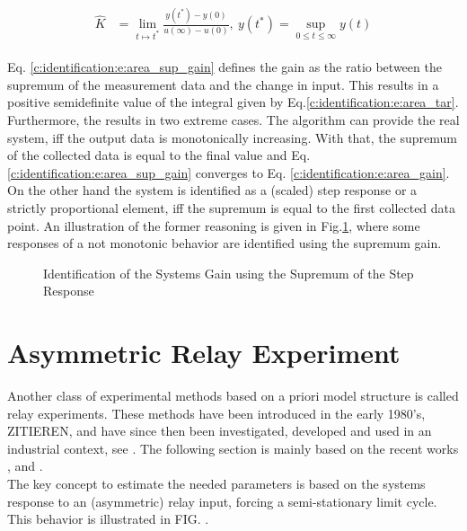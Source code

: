 \begin{align}
\begin{split}
\hat{K} &= \lim_{t\mapsto t^*} \frac{y(t^*)-y(0)}{u(\infty)-u(0)}, ~ y(t^*) = \sup_{0 \leq t \leq \infty} y(t)
\end{split}
\label{c:identification:e:area_sup_gain}
\end{align}

Eq. \ref{c:identification:e:area_sup_gain} defines the gain as the ratio between the supremum of the measurement data and the change in input. This results in a positive semidefinite value of the integral given by Eq.\ref{c:identification:e:area_tar}. Furthermore, the results in two extreme cases. The algorithm can provide the real system, iff the output data is monotonically increasing. With that, the supremum of the collected data is equal to the final value and Eq.\ref{c:identification:e:area_sup_gain} converges to Eq. \ref{c:identification:e:area_gain}. On the other hand the system is identified as a (scaled) step response or a strictly proportional element, iff the supremum is equal to the first collected data point. An illustration of the former reasoning is given in Fig.\ref{c:identification:f:SupGain}, where some responses of a not monotonic behavior are identified using the supremum gain.\\

\begin{figure}[H]\centering

\caption{Identification of the Systems Gain using the Supremum of the Step Response}
\label{c:identification:f:SupGain}
\end{figure}

\section{Asymmetric Relay Experiment}
\label{c:identification:s:relay}

Another class of experimental methods based on a priori model structure is called relay experiments. These methods have been introduced in the early 1980's, ZITIEREN, and have since then been investigated, developed and used in an industrial context, see . The following section is mainly based on the recent works \cite{Berner2016a}, \cite{Berner2015} and \cite{Berner2014a}.\\

The key concept to estimate the needed parameters is based on the systems response to an (asymmetric) relay input, forcing a semi-stationary limit cycle. This behavior is illustrated in FIG. .\\

